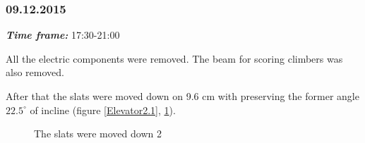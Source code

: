 \subsubsection{09.12.2015}
\textit{\textbf{Time frame:}} 17:30-21:00 

All the electric components were removed. The beam for scoring climbers was also removed. 

After that the slats were moved down on 9.6 cm with preserving the former angle $22.5^\circ$ of incline (figure \ref{Elevator2.1}, \ref{Elevator2.2}).

\begin{figure}[H]
	\begin{minipage}[h]{0.47\linewidth}
		\caption{The slats were moved down 1}
		\label{Elevator2.1}
	\end{minipage}
	\hfill
	\begin{minipage}[h]{0.47\linewidth}
		\caption{The slats were moved down 2}
		\label{Elevator2.2}
	\end{minipage}
\end{figure}
